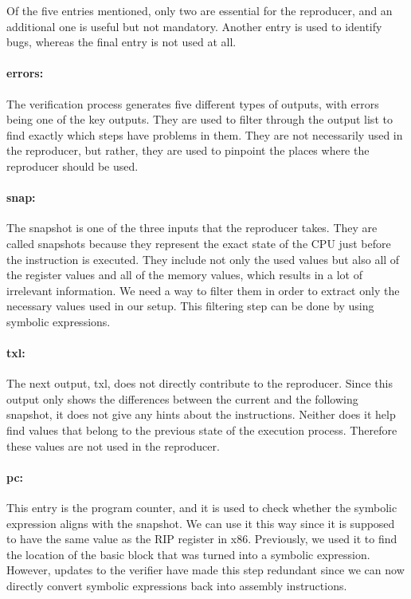 Of the five entries mentioned, only two are essential for the reproducer, and an additional one is useful but not mandatory.
Another entry is used to identify bugs, whereas the final entry is not used at all.

\paragraph{errors:}
The verification process generates five different types of outputs, with errors being one of the key outputs.
They are used to filter through the output list to find exactly which steps have problems in them.
They are not necessarily used in the reproducer, but rather, they are used to pinpoint the places where the reproducer should be used.

\paragraph{snap:}
The snapshot is one of the three inputs that the reproducer takes.
They are called snapshots because they represent the exact state of the CPU just before the instruction is executed.
They include not only the used values but also all of the register values and all of the memory values, which results in a lot of irrelevant information.
We need a way to filter them in order to extract only the necessary values used in our setup.
This filtering step can be done by using symbolic expressions. 

\paragraph{txl:}
The next output, txl, does not directly contribute to the reproducer.
Since this output only shows the differences between the current and the following snapshot, it does not give any hints about the instructions.
Neither does it help find values that belong to the previous state of the execution process.
Therefore these values are not used in the reproducer.

\paragraph{pc:}
This entry is the program counter, and it is used to check whether the symbolic expression aligns with the snapshot.
We can use it this way since it is supposed to have the same value as the RIP register in x86.
Previously, we used it to find the location of the basic block that was turned into a symbolic expression.
However, updates to the verifier have made this step redundant since we can now directly convert symbolic expressions back into assembly instructions.


